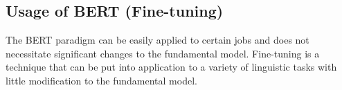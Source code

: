 










\subsection{Usage of BERT (Fine-tuning)}

The BERT paradigm can be easily applied to certain jobs and does not necessitate significant changes to the fundamental model. Fine-tuning is a technique that can be put into application to a variety of linguistic tasks with little modification to the fundamental model.

